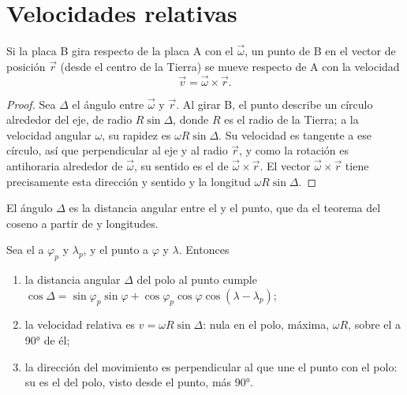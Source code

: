 \section{Velocidades relativas}

\begin{theorem}\label{thm:b1:plate-kinematics:velocity}
Si la placa B gira respecto de la placa A con el  $\vec\omega$, un punto de B en el vector de posición $\vec r$ (desde el
centro de la Tierra) se mueve respecto de A con la velocidad
\[
  \vec v = \vec\omega\times\vec r .
\]
\end{theorem}

\begin{proof}
Sea $\Delta$ el ángulo entre $\vec\omega$ y $\vec r$. Al girar B, el punto describe un círculo alrededor del eje, de radio $R\sin\Delta$,
donde $R$ es el radio de la Tierra; a la velocidad angular $\omega$, su rapidez es $\omega R\sin\Delta$. Su velocidad es tangente a
ese círculo, así que perpendicular al eje y al radio $\vec r$, y como la rotación es antihoraria alrededor de $\vec\omega$, su sentido es
el de $\vec\omega\times\vec r$. El vector $\vec\omega\times\vec r$ tiene precisamente esta dirección y sentido y la longitud
$\omega R\sin\Delta$.
\end{proof}

El ángulo $\Delta$ es la distancia angular entre el  y el punto, que da el teorema del coseno a partir de  y
longitudes.

\begin{proposition}\label{prop:b1:plate-kinematics:speed}
Sea el  a  $\varphi_p$ y  $\lambda_p$, y el punto a $\varphi$ y $\lambda$. Entonces
\begin{enumerate}
  \item la distancia angular $\Delta$ del polo al punto cumple
        $\cos\Delta = \sin\varphi_p\sin\varphi + \cos\varphi_p\cos\varphi
        \cos(\lambda - \lambda_p)$;
  \item la velocidad relativa es $v = \omega R\sin\Delta$: nula en el polo, máxima,
        $\omega R$, sobre el  a \ang{90} de él;
  \item la dirección del movimiento es perpendicular al  que une el punto
        con el polo: su  es el del polo, visto desde el punto, más \ang{90}.
\end{enumerate}
\end{proposition}

